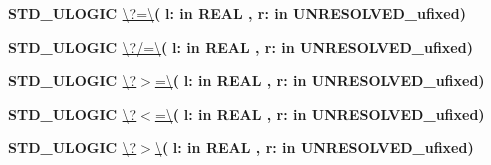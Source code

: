 \begin{DoxyCompactItemize}
\item 
{\bfseries {\bfseries \textcolor{comment}{S\+T\+D\+\_\+\+U\+L\+O\+G\+I\+C}\textcolor{vhdlchar}{ }}} \hyperlink{class__fixed__pkg_a69151531d87456d952c2073704fa1779}{\textbackslash{}?=\textbackslash{}}{\bfseries  ( }{\bfseries \textcolor{vhdlchar}{l\+: }\textcolor{stringliteral}{in }{\bfseries \textcolor{comment}{R\+E\+A\+L}\textcolor{vhdlchar}{ }}}{\bfseries  , \textcolor{vhdlchar}{r\+: }\textcolor{stringliteral}{in }\textcolor{vhdlchar}{U\+N\+R\+E\+S\+O\+L\+V\+E\+D\+\_\+ufixed}}{\bfseries  )} 
\item 
{\bfseries {\bfseries \textcolor{comment}{S\+T\+D\+\_\+\+U\+L\+O\+G\+I\+C}\textcolor{vhdlchar}{ }}} \hyperlink{class__fixed__pkg_a172a73302b09f0d298b93ecda8c5e976}{\textbackslash{}?/=\textbackslash{}}{\bfseries  ( }{\bfseries \textcolor{vhdlchar}{l\+: }\textcolor{stringliteral}{in }{\bfseries \textcolor{comment}{R\+E\+A\+L}\textcolor{vhdlchar}{ }}}{\bfseries  , \textcolor{vhdlchar}{r\+: }\textcolor{stringliteral}{in }\textcolor{vhdlchar}{U\+N\+R\+E\+S\+O\+L\+V\+E\+D\+\_\+ufixed}}{\bfseries  )} 
\item 
{\bfseries {\bfseries \textcolor{comment}{S\+T\+D\+\_\+\+U\+L\+O\+G\+I\+C}\textcolor{vhdlchar}{ }}} \hyperlink{class__fixed__pkg_a3adee8c12e5c0bb76fc3e1a493284a27}{\textbackslash{}?$>$=\textbackslash{}}{\bfseries  ( }{\bfseries \textcolor{vhdlchar}{l\+: }\textcolor{stringliteral}{in }{\bfseries \textcolor{comment}{R\+E\+A\+L}\textcolor{vhdlchar}{ }}}{\bfseries  , \textcolor{vhdlchar}{r\+: }\textcolor{stringliteral}{in }\textcolor{vhdlchar}{U\+N\+R\+E\+S\+O\+L\+V\+E\+D\+\_\+ufixed}}{\bfseries  )} 
\item 
{\bfseries {\bfseries \textcolor{comment}{S\+T\+D\+\_\+\+U\+L\+O\+G\+I\+C}\textcolor{vhdlchar}{ }}} \hyperlink{class__fixed__pkg_a271da29f659a2bc9480dbd29d7727913}{\textbackslash{}?$<$=\textbackslash{}}{\bfseries  ( }{\bfseries \textcolor{vhdlchar}{l\+: }\textcolor{stringliteral}{in }{\bfseries \textcolor{comment}{R\+E\+A\+L}\textcolor{vhdlchar}{ }}}{\bfseries  , \textcolor{vhdlchar}{r\+: }\textcolor{stringliteral}{in }\textcolor{vhdlchar}{U\+N\+R\+E\+S\+O\+L\+V\+E\+D\+\_\+ufixed}}{\bfseries  )} 
\item 
{\bfseries {\bfseries \textcolor{comment}{S\+T\+D\+\_\+\+U\+L\+O\+G\+I\+C}\textcolor{vhdlchar}{ }}} \hyperlink{class__fixed__pkg_a9e6b6b8c2c14da978e6f70cb6e85e6dc}{\textbackslash{}?$>$\textbackslash{}}{\bfseries  ( }{\bfseries \textcolor{vhdlchar}{l\+: }\textcolor{stringliteral}{in }{\bfseries \textcolor{comment}{R\+E\+A\+L}\textcolor{vhdlchar}{ }}}{\bfseries  , \textcolor{vhdlchar}{r\+: }\textcolor{stringliteral}{in }\textcolor{vhdlchar}{U\+N\+R\+E\+S\+O\+L\+V\+E\+D\+\_\+ufixed}}{\bfseries  )} 

\end{DoxyCompactItemize}
